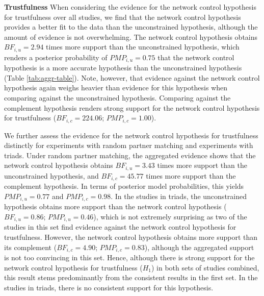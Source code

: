 \documentclass[
  11pt,
]{article}
\begin{document}
\textbf{Trustfulness} \hspace{8pt} When considering the evidence for the network control hypothesis for trustfulness over all studies, we find that the network control hypothesis provides a better fit to the data than the unconstrained hypothesis, although the amount of evidence is not overwhelming.
The network control hypothesis obtains \(BF_{i,u} = 2.94\) times more support than the unconstrained hypothesis, which renders a posterior probability of \(PMP_{i,u} = 0.75\) that the network control hypothesis is a more accurate hypothesis than the unconstrained hypothesis (Table \ref{tab:aggr-table}).
Note, however, that evidence against the network control hypothesis again weighs heavier than evidence for this hypothesis when comparing against the unconstrained hypothesis.
Comparing against the complement hypothesis renders strong support for the network control hypothesis for trustfulness (\(BF_{i,c} = 224.06\); \(PMP_{i,c} = 1.00\)).

We further assess the evidence for the network control hypothesis for trustfulness distinctly for experiments with random partner matching and experiments with triads.
Under random partner matching, the aggregated evidence shows that the network control hypothesis obtains \(BF_{i,u} = 3.43\) times more support than the unconstrained hypothesis, and \(BF_{i,c} = 45.77\) times more support than the complement hypothesis.
In terms of posterior model probabilities, this yields \(PMP_{i,u} = 0.77\) and \(PMP_{i,c} = 0.98\).
In the studies in triads, the unconstrained hypothesis obtains more support than the network control hypothesis (\(BF_{i,u} = 0.86\); \(PMP_{i,u} = 0.46\)), which is not extremely surprising as two of the studies in this set find evidence against the network control hypothesis for trustfulness.
However, the network control hypothesis obtains more support than its complement (\(BF_{i,c} = 4.90\); \(PMP_{i,c} = 0.83\)), although the aggregated support is not too convincing in this set.
Hence, although there is strong support for the network control hypothesis for trustfulness (\(H_1\)) in both sets of studies combined, this result stems predominantly from the consistent results in the first set.
In the studies in triads, there is no consistent support for this hypothesis.
\end{document}
